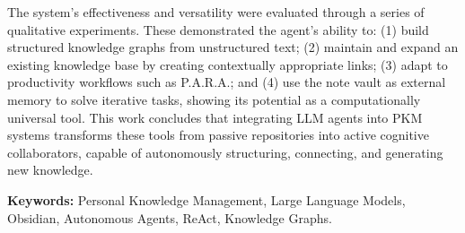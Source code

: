 The system's effectiveness and versatility were evaluated through a series of qualitative experiments. These demonstrated the agent's ability to: (1) build structured knowledge graphs from unstructured text; (2) maintain and expand an existing knowledge base by creating contextually appropriate links; (3) adapt to productivity workflows such as P.A.R.A.; and (4) use the note vault as external memory to solve iterative tasks, showing its potential as a computationally universal tool. This work concludes that integrating LLM agents into PKM systems transforms these tools from passive repositories into active cognitive collaborators, capable of autonomously structuring, connecting, and generating new knowledge.

\vspace{1cm}
\textbf{Keywords:} Personal Knowledge Management, Large Language Models, Obsidian, Autonomous Agents, ReAct, Knowledge Graphs.
